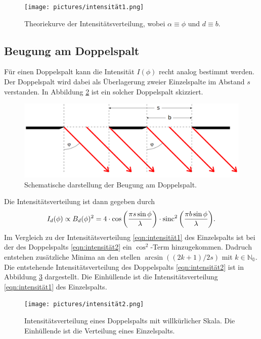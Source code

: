 \begin{figure}[H]
    \centering
    \texttt{[image: pictures/intensität1.png]}
    \caption{Theoriekurve der Intensitätsverteilung, wobei $\alpha\equiv\phi$ und $d\equiv b$. \cite{AP03}} %
    \label{fig:frauenhofer2}
\end{figure}

\subsection{Beugung am Doppelspalt}
\label{sec:doppel}
Für einen Doppelspalt kann die Intensität $I(\phi)$ recht analog bestimmt werden. Der Doppelspalt wird dabei als Überlagerung zweier Einzelspalte im
Abstand $s$ verstanden. In Abbildung \ref{fig:doppel} ist ein solcher Doppelspalt skizziert.
\begin{figure}[H]
    \centering
    \includegraphics[scale = 0.4]{pictures/doppel.png}
    \caption{Schematische darstellung der Beugung am Doppelspalt. \cite{AP01}}
    \label{fig:doppel}
\end{figure}

\noindent
Die Intensitätsverteilung ist dann gegeben durch
\begin{equation}
    I_d(\phi)\propto B_d(\phi)^2
    =4\cdot \cos{\left(\frac{\pi s\sin{\phi}}{\lambda}\right)}\cdot \operatorname{sinc}^2{\left(\frac{\pi b \sin{\phi}}{\lambda}\right)}  .
    \label{eqn:intensität2}
\end{equation}
Im Vergleich zu der Intensitätsverteilung \eqref{eqn:intensität1} des Einzelspalts ist bei der des Doppelspalts \eqref{eqn:intensität2} ein
$\cos^2$-Term hinzugekommen. Dadruch entstehen zusätzliche Minima an den stellen $\arcsin{((2k+1)/2s)}$ mit $k\in\mathbb{N_0}$. Die entstehende 
Intensitätsverteilung des Doppelspalts \eqref{eqn:intensität2} ist in Abbildung \ref{fig:intensität2} dargestellt. Die Einhüllende ist die Intensitätsverteilung 
\ref{eqn:intensität1} des Einzelspalts.
\begin{figure}[H]
    \centering
    \texttt{[image: pictures/intensität2.png]}
    \caption{Intensitätsverteilung eines Doppelspalts mit willkürlicher Skala. Die Einhüllende ist die Verteilung eines Einzelspalts. \cite{AP04}}
    \label{fig:intensität2}
\end{figure}

